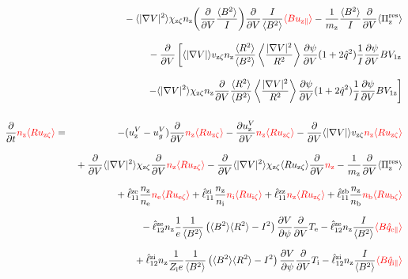 \documentclass[11pt]{article}
\def\r#1{{\rm#1}}
\def\ave#1{\left\langle#1\right\rangle}
\def\aves#1{\langle#1\rangle}
\def\dd#1#2{\frac{\partial #1}{\partial #2}}
\def\para{\parallel}
\def\ddV{\frac{\partial}{\partial V}}
\def\ddt{\frac{\partial}{\partial t}}
\def\mz{m_\r{z}}
\def\nee{n_\r{e}}
\def\ni{n_\r{i}}
\def\nz{n_\r{z}}
\def\nb{n_\r{b}}
\def\Te{T_\r{e}}
\def\Ti{T_\r{i}}
\def\Zi{Z_\r{i}}
\def\uzt#1{u_{\r{#1}\zeta}}
\def\upara#1{u_{\r{#1}\para}}
\def\qhatpara#1{\hat{q}_{\r{#1}\para}}
\def\uV#1{u_\r{#1}^V}
\def\ugV{u_{g}^V}
\def\chis#1{\chi_\r{#1}}
\def\bri{\aves{B^2}\aves{R^2} - I^2}
\def\red#1{\textcolor{red}{#1}}
\begin{document}
\begin{eqnarray}
\nonumber\\[3mm]&&{}
%
  - \aves{|\nabla V|^2} \chis{z\zeta} \nz \biggl( \ddV
  \frac{\aves{B^2}}{I} \biggr) \ddV \frac{I}{\aves{B^2}} \red{\aves{B \upara{z}}}
%
  - \frac{1}{\mz} \frac{\aves{B^2}}{I} \ddV \aves{\Pi_\r{z}^\r{res}}
\nonumber\\[3mm]&&{}
%
  - \ddV
    \left[  \aves{|\nabla V|} v_{\r{z}\zeta} \nz
            \frac{\aves{R^2}}{\aves{B^2}}\ave{\frac{|\nabla V|^2}{R^2}}\dd{\psi}{V}(1+2\hat{q}^2)
	    \frac{1}{I} \dd{\psi}{V} BV_{1\r{z}} \right.
\nonumber\\[3mm]&&{}
    \left.- \aves{|\nabla V|^2} \chis{z\zeta} \nz
          \ddV \frac{\aves{R^2}}{\aves{B^2}}\ave{\frac{|\nabla V|^2}{R^2}}\dd{\psi}{V}(1+2\hat{q}^2)
	  \frac{1}{I} \dd{\psi}{V} BV_{1\r{z}}\right]
\\[5mm]
  \ddt \red{\nz \aves{R \uzt{z}}} &=&
%
  - (\uV{z} - \ugV) \ddV \red{\nz \aves{R \uzt{z}}}
%
  - \dd{\uV{z}}{V} \red{\nz \aves{R \uzt{z}}}
%
  - \ddV \aves{|\nabla V|} v_{\r{z}\zeta} \red{\nz \aves{R \uzt{z}}}
\nonumber\\[3mm]&&{}
  + \ddV \aves{|\nabla V|^2} \chis{z\zeta} \ddV \red{\nz \aves{R \uzt{z}}}
  - \ddV \aves{|\nabla V|^2} \chis{z\zeta} \aves{R \uzt{z}}\ddV \red{\nz} 
  - \frac{1}{\mz} \ddV \aves{\Pi_\r{z}^\r{res}}
\nonumber\\[2.5mm]&&{}
%
  + \hat{\ell}_{11}^\r{ze} \frac{\nz}{\nee} \red{\nee \aves{R \uzt{e}}}
  + \hat{\ell}_{11}^\r{zi} \frac{\nz}{\ni}  \red{\ni  \aves{R \uzt{i}}}
  + \hat{\ell}_{11}^\r{zz}                  \red{\nz  \aves{R \uzt{z}}}
  + \hat{\ell}_{11}^\r{zb} \frac{\nz}{\nb}  \red{\nb  \aves{R \uzt{b}}}
\nonumber\\[2.5mm]&&{}
%
  - \hat{\ell}_{12}^\r{ze} \nz \frac{1}{e} \frac{1}{\aves{B^2}} \left( \bri \right)
    \dd{V}{\psi} \ddV \Te
  - \hat{\ell}_{12}^\r{ze} \nz \frac{I}{\aves{B^2}} \red{\aves{B \qhatpara{e}}}
\nonumber\\[2.5mm]&&{}
  + \hat{\ell}_{12}^\r{zi} \nz \frac{1}{\Zi e} \frac{1}{\aves{B^2}} \left( \bri \right)
    \dd{V}{\psi} \ddV \Ti
  - \hat{\ell}_{12}^\r{zi} \nz \frac{I}{\aves{B^2}} \red{\aves{B \qhatpara{i}}}
\nonumber\\[2.5mm]&&{}

\end{eqnarray}
\end{document}
